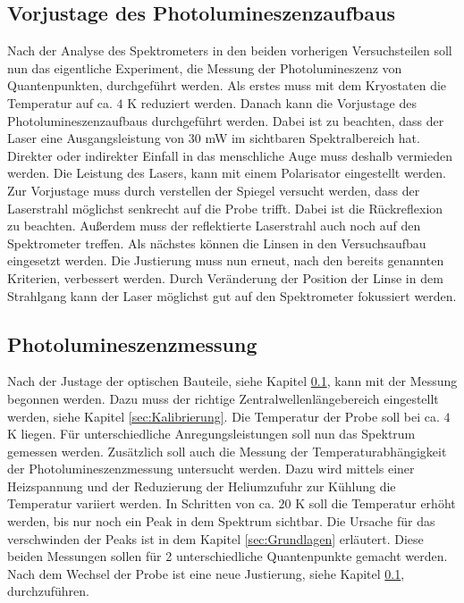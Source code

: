 \subsection{Vorjustage des Photolumineszenzaufbaus}
\label{sec:Justage}
Nach der Analyse des Spektrometers in den beiden vorherigen Versuchsteilen soll nun das eigentliche Experiment, die Messung der Photolumineszenz von Quantenpunkten, durchgeführt werden. 
Als erstes muss mit dem Kryostaten die Temperatur auf ca. $4$ K reduziert werden. 
Danach kann die Vorjustage des Photolumineszenzaufbaus durchgeführt werden. 
Dabei ist zu beachten, dass der Laser eine Ausgangsleistung von $30$ mW im sichtbaren Spektralbereich hat. 
Direkter oder indirekter Einfall in das menschliche Auge muss deshalb vermieden werden. 
Die Leistung des Lasers, kann mit einem Polarisator eingestellt werden. 
Zur Vorjustage muss durch verstellen der Spiegel versucht werden, dass der Laserstrahl möglichst senkrecht auf die Probe trifft. 
Dabei ist die Rückreflexion zu beachten.
Au{\ss}erdem muss der reflektierte Laserstrahl auch noch auf den Spektrometer treffen. 
Als nächstes können die Linsen in den Versuchsaufbau eingesetzt werden. 
Die Justierung muss nun erneut, nach den bereits genannten Kriterien, verbessert werden. 
Durch Veränderung der Position der Linse in dem Strahlgang kann der Laser möglichst gut auf den Spektrometer fokussiert werden. 
\subsection{Photolumineszenzmessung}
Nach der Justage der optischen Bauteile, siehe Kapitel \ref{sec:Justage}, kann mit der Messung begonnen werden.
Dazu muss der richtige Zentralwellenlängebereich eingestellt werden, siehe Kapitel \ref{sec:Kalibrierung}. 
Die Temperatur der Probe soll bei ca. $4$ K liegen. Für unterschiedliche Anregungsleistungen soll nun das Spektrum gemessen werden.  
Zusätzlich soll auch die Messung der Temperaturabhängigkeit der Photolumineszenzmessung untersucht werden. 
Dazu wird mittels einer Heizspannung und der Reduzierung der Heliumzufuhr zur Kühlung die Temperatur variiert werden.
In Schritten von ca. $20$ K soll die Temperatur erhöht werden, bis nur noch ein Peak in dem Spektrum sichtbar. Die Ursache für das verschwinden der Peaks ist in dem Kapitel \ref{sec:Grundlagen} erläutert. 
Diese beiden Messungen sollen für 2 unterschiedliche Quantenpunkte gemacht werden. 
Nach dem Wechsel der Probe ist eine neue Justierung, siehe Kapitel \ref{sec:Justage}, durchzuführen.  


